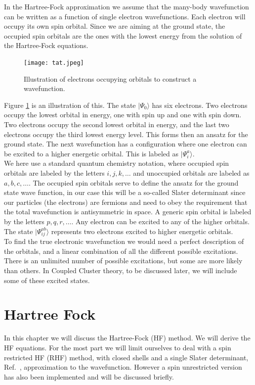 \documentclass[a4paper,norsk,11pt,twoside]{report}
\begin{document}
 In the Hartree-Fock approximation we assume that the many-body wavefunction can be
written as a function of single electron wavefunctions. Each electron
will occupy its own spin orbital. Since we are aiming at the ground state, the
occupied spin orbitals are the ones with the lowest energy from the solution of the Hartree-Fock equations.\\

\begin{figure}[ht!]
\centering
\texttt{[image: tat.jpeg]}
\caption{Illustration of electrons occupying orbitals to construct a wavefunction.}
\label{fig:basic_kapitell1_fig}
\end{figure}

Figure \ref{fig:basic_kapitell1_fig} is an illustration of
this. The state $|\Psi_0 \rangle$ has six electrons. Two electrons occupy the
lowest orbital in energy, one with spin up and one with spin down. Two electrons
occupy the second lowest orbital in energy, and the last two electrons occupy the third
lowest energy level. This forms then an ansatz for  the ground state. The next wavefunction has a
configuration where one electron can be  excited to a higher energetic
orbital. This is labeled as $| \Psi_i^a \rangle$. \\

We here use a standard quantum chemistry notation, where
occupied spin orbitals are labeled by the letters $i,j,k,\dots$ and unoccupied orbitals are labeled as 
$a,b,c,\dots$. 
The occupied spin orbitals serve to define the ansatz for the ground state wave function, in our case this will be a 
so-called Slater determinant since our particles (the electrons) are fermions and need to obey the requirement that the 
total wavefunction is antisymmetric in space. 
A generic spin orbital is labeled by the letters $p,q,r,\dots$. Any electron can be
excited to any of the higher orbitals. The state $|\Psi_{ij}^{ab} \rangle$
represents two electrons excited to higher energetic orbitals. \\

To find the true electronic wavefunction we would need a perfect
description of the orbitals, and a linear combination of all the
different possible excitations. There is an unlimited number of
possible excitations, but some are more likely than others. In Coupled
Cluster theory, to be discussed later, we will include some of these excited states. 




\chapter{Hartree Fock \label{hf_chapter_reference}}
In this chapter we will discuss the Hartree-Fock (HF) method. We will
derive the HF equations. For the most part we will limit ourselves to
deal with a spin restricted HF (RHF) method, with closed shells and a
single Slater determinant, Ref.~\cite{slater_determinant_new_citation}, approximation to the wavefunction. However a
spin unrestricted version has also been implemented and will be
discussed briefly. \\
\end{document}
